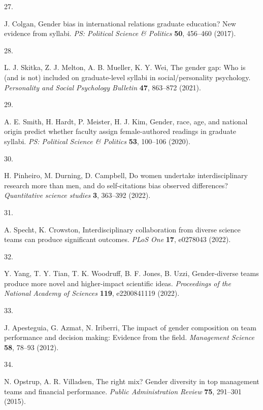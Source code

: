 \documentclass[
  11pt, %
]{article}
\newlength{\cslhangindent}
\newlength{\csllabelwidth}
\newenvironment{CSLReferences}[2] %
 {\begin{list}{}{%
  \setlength{\itemindent}{0pt}
  \setlength{\leftmargin}{0pt}
  \setlength{\parsep}{0pt}
  \ifodd #1
   \setlength{\leftmargin}{\cslhangindent}
   \setlength{\itemindent}{-1\cslhangindent}
  \fi
  \setlength{\itemsep}{#2\baselineskip}}}
 {\end{list}}
\newcommand{\CSLLeftMargin}[1]{\parbox[t]{\csllabelwidth}{\strut#1\strut}}
\newcommand{\CSLRightInline}[1]{\parbox[t]{\linewidth - \csllabelwidth}{\strut#1\strut}}
\begin{document}
\begin{CSLReferences}{0}{1}
\CSLLeftMargin{27. }%
\CSLRightInline{J. Colgan, Gender bias in international relations graduate education? New evidence from syllabi. \emph{PS: Political Science \& Politics} \textbf{50}, 456--460 (2017).}

\CSLLeftMargin{28. }%
\CSLRightInline{L. J. Skitka, Z. J. Melton, A. B. Mueller, K. Y. Wei, The gender gap: Who is (and is not) included on graduate-level syllabi in social/personality psychology. \emph{Personality and Social Psychology Bulletin} \textbf{47}, 863--872 (2021).}

\CSLLeftMargin{29. }%
\CSLRightInline{A. E. Smith, H. Hardt, P. Meister, H. J. Kim, Gender, race, age, and national origin predict whether faculty assign female-authored readings in graduate syllabi. \emph{PS: Political Science \& Politics} \textbf{53}, 100--106 (2020).}

\CSLLeftMargin{30. }%
\CSLRightInline{H. Pinheiro, M. Durning, D. Campbell, Do women undertake interdisciplinary research more than men, and do self-citations bias observed differences? \emph{Quantitative science studies} \textbf{3}, 363--392 (2022).}

\CSLLeftMargin{31. }%
\CSLRightInline{A. Specht, K. Crowston, Interdisciplinary collaboration from diverse science teams can produce significant outcomes. \emph{PLoS One} \textbf{17}, e0278043 (2022).}

\CSLLeftMargin{32. }%
\CSLRightInline{Y. Yang, T. Y. Tian, T. K. Woodruff, B. F. Jones, B. Uzzi, Gender-diverse teams produce more novel and higher-impact scientific ideas. \emph{Proceedings of the National Academy of Sciences} \textbf{119}, e2200841119 (2022).}

\CSLLeftMargin{33. }%
\CSLRightInline{J. Apesteguia, G. Azmat, N. Iriberri, The impact of gender composition on team performance and decision making: Evidence from the field. \emph{Management Science} \textbf{58}, 78--93 (2012).}

\CSLLeftMargin{34. }%
\CSLRightInline{N. Opstrup, A. R. Villadsen, The right mix? Gender diversity in top management teams and financial performance. \emph{Public Administration Review} \textbf{75}, 291--301 (2015).}


\end{CSLReferences}
\end{document}
